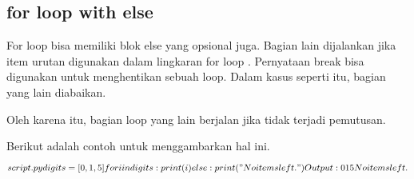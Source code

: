 \subsection{for loop with else}
For loop bisa memiliki blok else yang opsional juga. Bagian lain dijalankan jika item urutan digunakan dalam lingkaran for loop .
Pernyataan break bisa digunakan untuk menghentikan sebuah loop. Dalam kasus seperti itu, bagian yang lain diabaikan.

Oleh karena itu, bagian loop yang lain berjalan jika tidak terjadi pemutusan.

Berikut adalah contoh untuk menggambarkan hal ini.
\begin{equation}
script.py 
digits = [0, 1, 5]

for i in digits:
    print(i)
else:
    print("No items left.")
Output :
0
1
5
No items left.
\end{equation}
